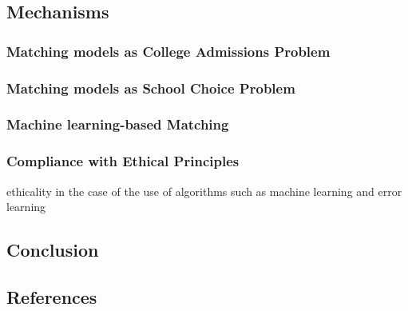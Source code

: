 \documentclass[letterpaper]{article} %
\begin{document}
    \subsection{Mechanisms}

    \subsubsection{Matching models as College Admissions Problem}



    \cite{basshuysen}

    \subsubsection{Matching models as School Choice Problem}

    \cite{basshuysen}

    \subsubsection{Machine learning-based Matching}

    \cite{olbergml}

    \subsubsection{Compliance with Ethical Principles}

    \cite{basshuysen}

    ethicality in the case of the use of algorithms such as machine learning and error learning

    \subsection{Conclusion}

    \subsection{References}


    
\end{document}

